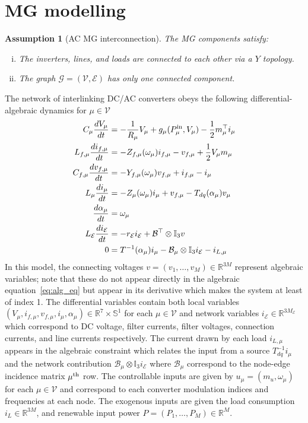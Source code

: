 \documentclass[journal, final, letterpaper]{IEEEtran}
\newtheorem{assumption}{Assumption}
\newcommand{\ts}[1]{{\textnormal{#1}}}
\newcommand{\diff}[2]{{\frac{d #1}{d #2}}}
\newcommand{\Rset}{\mathbb{R}}
\newcommand{\mc}{\mathcal}
\newcommand{\mbb}{\mathbb}
\begin{document}

%
%
\section{\ac{MG} modelling}
\label{sec:mg_modelling}

\begin{assumption}[AC \ac{MG} interconnection] The \ac{MG} components satisfy:
\begin{enumerate}[i)]
	\item The inverters, lines, and loads are connected to each other via a $Y$ topology.
	\item The graph $\mc{G} = (\mc{V},\mc{E})$ has only one connected component. 
\end{enumerate}
\label{asssump:MG_connected}
\end{assumption}
%
The network of interlinking DC/AC converters obeys the following differential-algebraic dynamics for $\mu\in\mc{V}$
%
\begin{subequations}
  \begin{align}
    C_\mu \diff{V_\mu}{t} & = -\frac{1}{R_\mu}V_\mu + g_\mu(P_\mu^\ts{in},V_\mu) - \frac{1}{2}m_\mu^\top i_\mu\\
    L_{f,\mu} \diff{i_{f,\mu}}{t} &= -Z_{f,\mu}(\omega_\mu) i_{f,\mu} - v_{f,\mu} + \frac{1}{2}V_\mu m_\mu\\
    C_{f,\mu} \diff{v_{f,\mu}}{t} &= -Y_{f,\mu}(\omega_\mu) v_{f,\mu} + i_{f,\mu} - i_{\mu}\\
    L_\mu \diff{i_{\mu}}{t} &= -Z_\mu(\omega_\mu) i_{\mu} + v_{f,\mu} -T_{dq}(\alpha_\mu)v_{\mu}\\
    \diff{\alpha_\mu}{t}  &= \omega_\mu\\
    L_\mc{E}\diff{i_\mc{E}}{t} & = -r_\mc{E}i_\mc{E} + \mc{B}^\top\otimes\mbb{I}_3 v\\
    0  &= T^{-1}(\alpha_\mu)i_\mu - \mc{B}_\mu\otimes\mbb{I}_3 i_\mc{E} - i_{L,\mu}\label{eq:alg_eq}
\end{align}
\label{eq:mg_AC_model}
\end{subequations}
%
In this model, the connecting voltages $v = (v_1,\ldots,v_M)\in\Rset^{3M}$ represent algebraic variables; note that these do not appear directly in the algebraic equation~\eqref{eq:alg_eq} but appear in its derivative which makes the system at least of index 1. The differential variables contain both local variables $(V_\mu,i_{f,\mu},v_{f,\mu},i_\mu,\alpha_\mu)\in\Rset^{7}\times\mbb{S}^{1}$ for each $\mu\in\mc{V}$ and network variables $i_\mc{E}\in\Rset^{3M_\mc{E}}$ which correspond to DC voltage, filter currents, filter voltages, connection currents, and line currents respectively. The current drawn by each load $i_{L,\mu}$ appears in the algebraic constraint which relates the input from a source $T_{dq}^{-1}i_{\mu}$ and the network contribution $\mc{B}_{\mu}\otimes\mbb{I}_3i_\mc{E}$ where $\mc{B}_\mu$ correspond to the node-edge incidence matrix  $\mu^\ts{th}$ row. The controllable inputs are given by $u_\mu = (m_u,\omega_\mu)$ for each $\mu\in\mc{V}$ and correspond to each converter modulation indices and frequencies at each node. The exogenous inputs are given the load consumption $i_L\in\Rset^{3M}$, and renewable input power $P = (P_1,\ldots,P_M) \in \Rset^{M}$.
\end{document}
